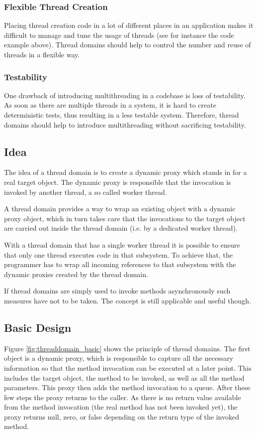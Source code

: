 \subsubsection{Flexible Thread Creation}
Placing thread creation code in a lot of different places in an application
makes it difficult to manage and tune the usage of threads (see for instance
the code example above). Thread domains should help to control the
number and reuse of threads in a flexible way.

\subsubsection{Testability}
One drawback of introducing multithreading in a codebase is loss of
testability. As soon as there are multiple threads in a system, it is
hard to create deterministic tests, thus resulting in a less testable
system. Therefore, thread domains should help to introduce multithreading
without sacrificing testability.


\subsection{Idea}
The idea of a thread domain is to create a dynamic proxy which stands
in for a real target object. The dynamic proxy is responsible that the
invocation is invoked by another thread, a so called worker thread. 

A thread domain provides a way to wrap an existing object with a dynamic
proxy object, which in turn takes care that the invocations to the
target object are carried out inside the thread domain (i.e. by a 
dedicated worker thread).

With a thread domain that has a single worker thread it is possible to ensure
that only one thread executes code in that subsystem. To achieve that, the
programmer has to wrap all incoming references to that subsystem with
the dynamic proxies created by the thread domain.

If thread domains are simply used to
invoke methods asynchronously such measures have not to be taken. The
concept is still applicable and useful though.


\subsection{Basic Design}
\label{sect:threaddomain.introduction.principle}
Figure \ref{fig:threaddomain_basic} shows the principle of thread domains.
The first object is a dynamic proxy, which is responsible to
capture all the necessary information so that the method invocation can
be executed at a later point. This includes the target object, the method
to be invoked, as well as all the method parameters. This proxy then adds
the method invocation to a queue. After these few steps the proxy returns
to the caller. As there is no return value available from the method 
invocation (the real method has not been invoked yet), the proxy returns
null, zero, or false depending on the return type of the
invoked method.

